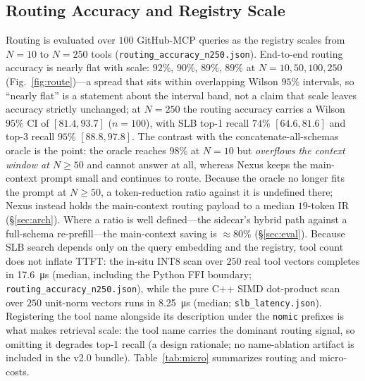 \documentclass[10pt,conference]{IEEEtran}
\newcommand{\code}[1]{\texttt{\small #1}}
\begin{document}
\subsection{Routing Accuracy and Registry Scale}
Routing is evaluated over $100$ GitHub-MCP queries as the registry scales from $N=10$ to $N=250$
tools (\code{routing\_accuracy\_n250.json}). End-to-end routing accuracy is nearly flat with scale:
$92\%$, $90\%$, $89\%$, $89\%$ at $N=10,50,100,250$ (Fig.~\ref{fig:route})---a spread that sits
within overlapping Wilson $95\%$ intervals, so ``nearly flat'' is a statement about the interval
band, not a claim that scale leaves accuracy strictly unchanged; at $N=250$ the routing
accuracy carries a Wilson $95\%$ CI of $[81.4, 93.7]$ ($n{=}100$), with SLB top-1 recall
$74\%$ $[64.6, 81.6]$ and top-3 recall $95\%$ $[88.8, 97.8]$. The contrast with the
concatenate-all-schemas oracle is
the point: the oracle reaches $98\%$ at $N=10$ but \emph{overflows the context window at $N\ge50$}
and cannot answer at all, whereas Nexus keeps the main-context prompt small and continues to route.
Because the oracle no longer fits the prompt at $N\ge50$, a token-reduction ratio against it is
undefined there; Nexus instead holds the main-context routing payload to a median $19$-token IR
(\S\ref{sec:arch}). Where a ratio is well defined---the sidecar's hybrid path against a
full-schema re-prefill---the main-context saving is ${\approx}80\%$ (\S\ref{sec:eval}). Because SLB search depends only on the query
embedding and the registry, tool count does not inflate TTFT: the in-situ INT8 scan over $250$ real
tool vectors completes in \SI{17.6}{\micro\second} (median, including the Python FFI boundary;
\code{routing\_accuracy\_n250.json}), while the pure C++ SIMD dot-product scan over $250$ unit-norm
vectors runs in \SI{8.25}{\micro\second} (median; \code{slb\_latency.json}). Registering the tool
name alongside its
description under the \code{nomic} prefixes is what makes retrieval scale: the tool name carries the
dominant routing signal, so omitting it degrades top-1 recall (a design rationale; no name-ablation
artifact is included in the v2.0 bundle). Table~\ref{tab:micro} summarizes routing and micro-costs.
\end{document}
